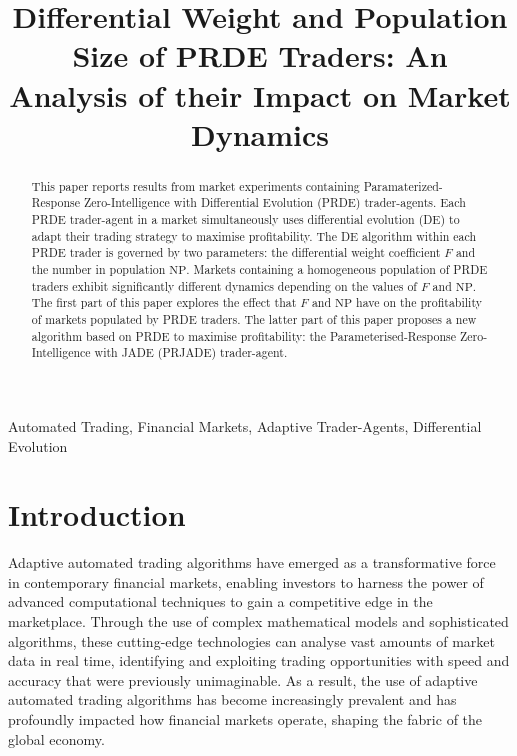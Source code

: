 \documentclass[conference]{IEEEtran}
\begin{document}
\title{Differential Weight and Population Size of PRDE Traders: An Analysis of their Impact on Market Dynamics}

\author{
}

\maketitle

\begin{abstract}
This paper reports results from market experiments containing Paramaterized-Response Zero-Intelligence with Differential Evolution (PRDE) trader-agents.
Each PRDE trader-agent in a market simultaneously uses differential evolution (DE) to adapt their trading strategy to maximise profitability.
The DE algorithm within each PRDE trader is governed by two parameters: the differential weight coefficient $F$ and the number in population $\mathrm{NP}$.
Markets containing a homogeneous population of PRDE traders exhibit significantly different dynamics depending on the values of $F$ and $\mathrm{NP}$.
The first part of this paper explores the effect that $F$ and $\mathrm{NP}$ have on the profitability of markets populated by PRDE traders.
The latter part of this paper proposes a new algorithm based on PRDE to maximise profitability: the Parameterised-Response Zero-Intelligence with JADE (PRJADE) trader-agent.

\end{abstract}

\begin{IEEEkeywords}
Automated Trading, Financial Markets, Adaptive Trader-Agents, Differential Evolution
\end{IEEEkeywords}

\section{Introduction}

Adaptive automated trading algorithms have emerged as a transformative force in contemporary financial markets, enabling investors to harness the power of advanced computational techniques to gain a competitive edge in the marketplace.
Through the use of complex mathematical models and sophisticated algorithms, these cutting-edge technologies can analyse vast amounts of market data in real time, identifying and exploiting trading opportunities with speed and accuracy that were previously unimaginable.
As a result, the use of adaptive automated trading algorithms has become increasingly prevalent and has profoundly impacted how financial markets operate, shaping the fabric of the global economy.
\end{document}

